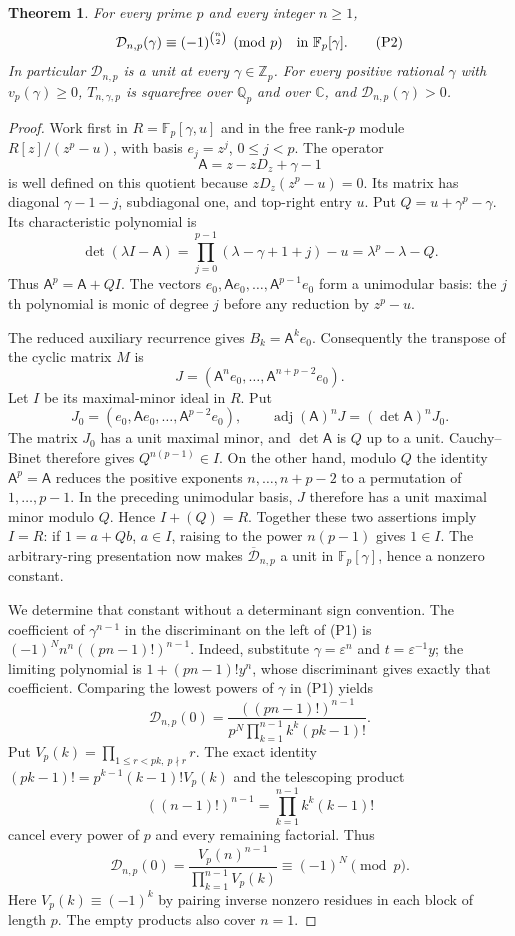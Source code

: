 \documentclass[11pt]{article}
\newtheorem{theorem}{Theorem}
\begin{document}
\begin{theorem}\label{thm:prime-gap-unit-terminal}
For every prime $p$ and every integer $n\ge1$,
\[
 \mathcal D_{n,p}(\gamma)\equiv(-1)^{\binom n2}
               \pmod p\quad\hbox{in }\mathbb F_p[\gamma]. \tag{P2}
\]
In particular $\mathcal D_{n,p}$ is a unit at every
$\gamma\in\mathbb Z_p$. For every positive rational $\gamma$ with
$v_p(\gamma)\ge0$, $T_{n,\gamma,p}$ is squarefree over
$\mathbb Q_p$ and over $\mathbb C$, and
$\mathcal D_{n,p}(\gamma)>0$.
\end{theorem}
\begin{proof}
Work first in $R=\mathbb F_p[\gamma,u]$ and in the free rank-$p$
module $R[z]/(z^p-u)$, with basis $e_j=z^j$, $0\le j<p$.
The operator
\[
 \mathsf A=z-zD_z+\gamma-1
\]
is well defined on this quotient because $zD_z(z^p-u)=0$.
Its matrix has diagonal $\gamma-1-j$, subdiagonal one, and
top-right entry $u$. Put $Q=u+\gamma^p-\gamma$.
Its characteristic polynomial is
\[
 \det(\lambda I-\mathsf A)
 =\prod_{j=0}^{p-1}(\lambda-\gamma+1+j)-u
 =\lambda^p-\lambda-Q.
\]
Thus $\mathsf A^p=\mathsf A+QI$.
The vectors $e_0,\mathsf Ae_0,\ldots,\mathsf A^{p-1}e_0$
form a unimodular basis: the $j$th polynomial is monic of degree
$j$ before any reduction by $z^p-u$.

The reduced auxiliary recurrence gives $B_k=\mathsf A^ke_0$.
Consequently the transpose of the cyclic matrix $M$ is
\[
 J=(\mathsf A^ne_0,\ldots,\mathsf A^{n+p-2}e_0).
\]
Let $I$ be its maximal-minor ideal in $R$. Put
\[
 J_0=(e_0,\mathsf Ae_0,\ldots,\mathsf A^{p-2}e_0),\qquad
 \operatorname{adj}(\mathsf A)^nJ=(\det\mathsf A)^nJ_0.
\]
The matrix $J_0$ has a unit maximal minor, and
$\det\mathsf A$ is $Q$ up to a unit. Cauchy--Binet therefore gives
$Q^{n(p-1)}\in I$.
On the other hand, modulo $Q$ the identity $\mathsf A^p=\mathsf A$
reduces the positive exponents $n,\ldots,n+p-2$ to a permutation of
$1,\ldots,p-1$. In the preceding unimodular basis, $J$ therefore has
a unit maximal minor modulo $Q$. Hence $I+(Q)=R$.
Together these two assertions imply $I=R$: if $1=a+Qb$, $a\in I$,
raising to the power $n(p-1)$ gives $1\in I$.
The arbitrary-ring presentation now makes
$\overline{\mathcal D}_{n,p}$ a unit in $\mathbb F_p[\gamma]$,
hence a nonzero constant.

We determine that constant without a determinant sign convention.
The coefficient of $\gamma^{n-1}$ in the discriminant on the left
of (P1) is
$(-1)^N n^n((pn-1)!)^{n-1}$.
Indeed, substitute $\gamma=\varepsilon^n$ and
$t=\varepsilon^{-1}y$; the limiting polynomial is
$1+(pn-1)!y^n$, whose discriminant gives exactly that coefficient.
Comparing the lowest powers of $\gamma$ in (P1) yields
\[
 \mathcal D_{n,p}(0)=
 \frac{((pn-1)!)^{n-1}}
 {p^N\prod_{k=1}^{n-1} k^k(pk-1)!}.
\]
Put $V_p(k)=\prod_{1\le r<pk,\ p\nmid r}r$. The exact identity
$(pk-1)!=p^{k-1}(k-1)!V_p(k)$ and the telescoping product
\[
 ((n-1)!)^{n-1}=\prod_{k=1}^{n-1}k^k(k-1)!
\]
cancel every power of $p$ and every remaining factorial. Thus
\[
 \mathcal D_{n,p}(0)=
 \frac{V_p(n)^{n-1}}{\prod_{k=1}^{n-1}V_p(k)}
 \equiv(-1)^N\pmod p.
\]
Here $V_p(k)\equiv(-1)^k$ by pairing inverse nonzero residues in
each block of length $p$. The empty products also cover $n=1$.


\end{proof}
\end{document}
